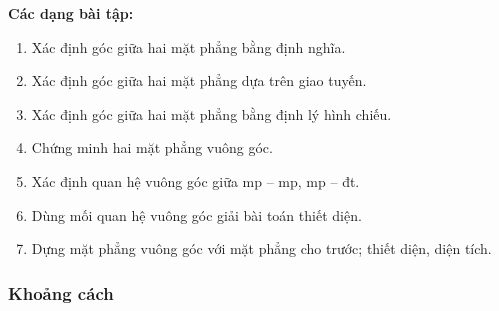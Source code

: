 \documentclass[12pt,a4paper]{article}
\begin{document}
\medskip\noindent\textbf{Các dạng bài tập:}
\begin{enumerate}[label=\textbf{Dạng \arabic*:}, leftmargin=*, align=left]
  \item Xác định góc giữa hai mặt phẳng bằng định nghĩa.
  \item Xác định góc giữa hai mặt phẳng dựa trên giao tuyến.
  \item Xác định góc giữa hai mặt phẳng bằng định lý hình chiếu.
  \item Chứng minh hai mặt phẳng vuông góc.
  \item Xác định quan hệ vuông góc giữa mp -- mp, mp -- đt.
  \item Dùng mối quan hệ vuông góc giải bài toán thiết diện.
  \item Dựng mặt phẳng vuông góc với mặt phẳng cho trước; thiết diện, diện tích.
\end{enumerate}

\subsubsection{Khoảng cách}
\end{document}
